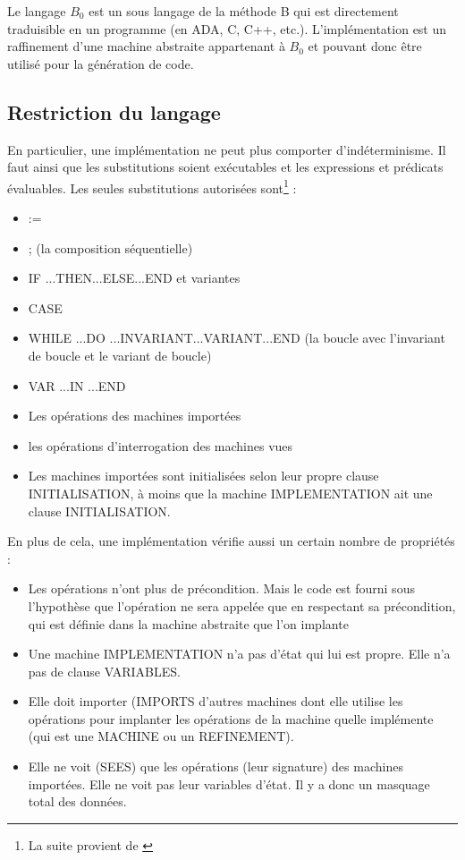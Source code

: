 \documentclass[10pt,a4paper]{article}
\begin{document}
Le langage $B_0$ est un sous langage de la méthode B qui est directement traduisible en un programme (en ADA, C, C++, etc.).
L'implémentation est un raffinement d'une machine abstraite appartenant à $B_0$ et pouvant donc être utilisé pour la génération de code.\\

\subsection{Restriction du langage}

En particulier, une implémentation ne peut plus comporter d'indéterminisme. Il faut ainsi que les substitutions soient exécutables et les expressions et prédicats évaluables.
Les seules substitutions autorisées sont\footnote{La suite provient de \cite{habrias2006specifications}} :
\begin{itemize}
\item :=
\item ; (la composition séquentielle)
\item IF ...THEN...ELSE...END et variantes
\item CASE
\item WHILE ...DO ...INVARIANT...VARIANT...END (la boucle avec l'invariant de boucle et le variant de boucle)
\item VAR ...IN ...END
\item Les opérations des machines importées
\item les opérations d'interrogation des machines vues
\item Les machines importées sont initialisées selon leur propre clause INITIALISATION, à moins que la machine IMPLEMENTATION ait une clause INITIALISATION.
\end{itemize}

En plus de cela, une implémentation vérifie aussi un certain nombre de propriétés :
\begin{itemize}
\item Les opérations n'ont plus de précondition. Mais le code est fourni sous l'hypothèse que l'opération ne sera appelée que en respectant sa précondition, qui est définie dans la machine abstraite que l'on implante
\item Une machine IMPLEMENTATION n'a pas d'état qui lui est propre. Elle n'a pas de clause VARIABLES.
\item Elle doit importer (IMPORTS d'autres machines dont elle utilise les opérations pour implanter les opérations de la machine quelle implémente (qui est une MACHINE ou un REFINEMENT). 
\item Elle ne voit (SEES) que les opérations (leur signature) des machines importées. Elle ne voit pas leur variables d'état. Il y a donc un masquage total des données.
\end{itemize}
\end{document}
